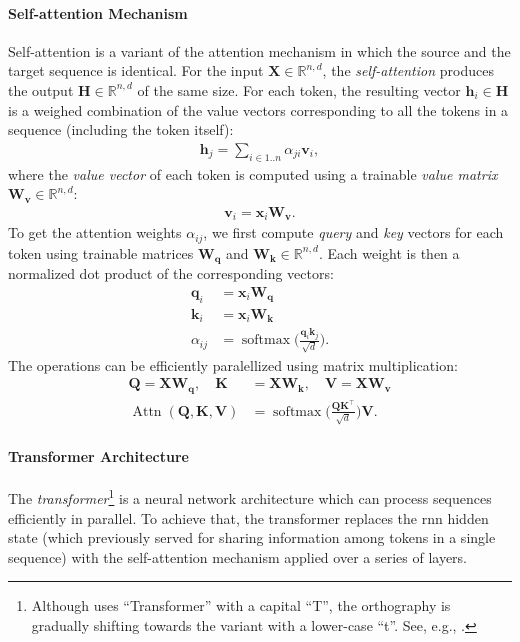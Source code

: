 \paragraph{Self-attention Mechanism} Self-attention \cite{cheng2016long,vaswani2017attention} is a variant of the attention mechanism in which the source and the target sequence is identical. For the input $\mathbf{X} \in \mathbb{R}^{n,d}$, the \emph{self-attention} produces the output $\mathbf{H} \in \mathbb{R}^{n,d}$ of the same size. For each token, the resulting vector $\mathbf{h}_i \in \mathbf{H}$ is a weighed combination of the value vectors corresponding to all the tokens in a sequence (including the token itself):
\begin{align}
    \mathbf{h}_j = \sum_{i\in 1..n} \alpha_{ji} \mathbf{v}_i,
\end{align}
where the \emph{value vector} of each token is computed using a trainable \emph{value matrix} $\mathbf{W_v} \in \mathbb{R}^{n,d}$:
\begin{align}
    \mathbf{v}_i = \mathbf{x}_i \mathbf{W_v}.
\end{align}
To get the attention weights $\alpha_{ij}$, we first compute \textit{query} and \textit{key} vectors for each token using trainable matrices $\mathbf{W_q}$ and $\mathbf{W_k} \in \mathbb{R}^{n,d}$. Each weight is then a normalized dot product of the corresponding vectors:
\begin{align}
    \mathbf{q}_i & = \mathbf{x}_i \mathbf{W_q}                                                      \\
    \mathbf{k}_i & = \mathbf{x}_i \mathbf{W_k}                                                      \\
    \alpha_{ij}  & = \operatorname{softmax}\biggl(\frac{\mathbf{q}_i\mathbf{k}_j}{\sqrt{d}}\biggr).
\end{align}
The operations can be efficiently paralellized using matrix multiplication:
\begin{align}
    \mathbf{Q}                                             = \mathbf{X}\mathbf{W_q},\quad\mathbf{K} & = \mathbf{X}\mathbf{W_k},\quad\mathbf{V} = \mathbf{X}\mathbf{W_v}                           \\
    \operatorname{Attn}(\mathbf{Q}, \mathbf{K}, \mathbf{V})                                         & = \operatorname{softmax}\biggl(\frac{\mathbf{Q}\mathbf{K}^\top}{\sqrt{d}}\biggr)\mathbf{V}.
\end{align}


\paragraph{Transformer Architecture} The \emph{transformer}\footnote{Although \citet{vaswani2017attention} uses ``Transformer'' with a capital ``T'', the orthography is gradually shifting towards the variant with a lower-case ``t''. See, e.g., \citet[p.~215]{jurafsky2024}.} \cite{vaswani2017attention} is a neural network architecture which can process sequences efficiently in parallel. To achieve that, the transformer replaces the \ac{rnn} hidden state (which previously served for sharing information among tokens in a single sequence) with the self-attention mechanism applied over a series of layers.

